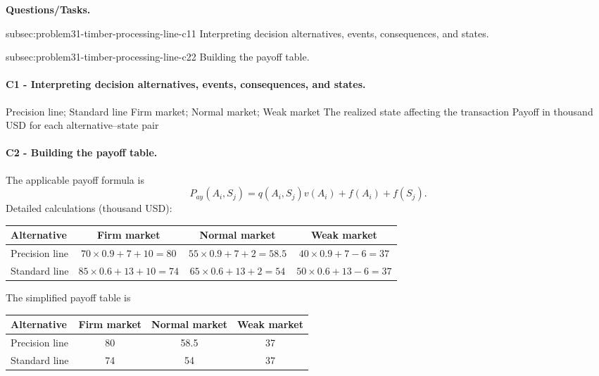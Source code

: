 	\textbf{Questions/Tasks.}
	\begin{enumerate}
	\CriterionTask
	{subsec:problem31-timber-processing-line-c1}{1}
	{Interpreting decision alternatives, events, consequences, and states.}

	\CriterionTask
	{subsec:problem31-timber-processing-line-c2}{2}
	{Building the payoff table.}
	\end{enumerate}

	\paragraph*{C1 - Interpreting decision alternatives, events, consequences, and states.}
	\label{subsec:problem31-timber-processing-line-c1}
	\DecisionElementsTable
	{Precision line; Standard line}
	{Firm market; Normal market; Weak market}
	{The realized state affecting the transaction}
	{Payoff in thousand USD for each alternative--state pair}

	\paragraph*{C2 - Building the payoff table.}
	\label{subsec:problem31-timber-processing-line-c2}
	The applicable payoff formula is
	\[ P_{ay}(A_i,S_j)=q(A_i,S_j)v(A_i)+f(A_i)+f(S_j). \]
	Detailed calculations (thousand USD):
	\begin{center}\small
	\begin{tabular}{lccc}
	\toprule
	Alternative & Firm market & Normal market & Weak market \\
	\midrule
	Precision line & $70\times 0.9+7+10=80$ & $55\times 0.9+7+2=58.5$ & $40\times 0.9+7-6=37$ \\
Standard line & $85\times 0.6+13+10=74$ & $65\times 0.6+13+2=54$ & $50\times 0.6+13-6=37$ \\
	\bottomrule
	\end{tabular}
	\end{center}
	The simplified payoff table is
	\begin{center}
	\begin{tabular}{lccc}
	\toprule
	Alternative & Firm market & Normal market & Weak market \\
	\midrule
	Precision line & 80 & 58.5 & 37 \\
Standard line & 74 & 54 & 37 \\
	\bottomrule
	\end{tabular}
	\end{center}

